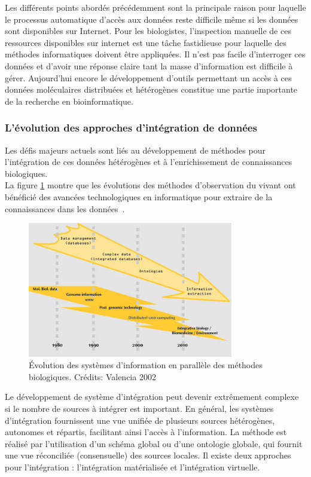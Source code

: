 Les différents points abordés précédemment sont la principale raison pour laquelle le processus automatique d’accès aux données reste difficile même si les données sont disponibles sur Internet. Pour les biologistes, l'inspection manuelle de ces ressources disponibles sur internet est une tâche fastidieuse pour laquelle des méthodes informatiques doivent être appliquées. Il n’est pas facile d’interroger ces données et d’avoir une réponse claire tant la masse d’information est difficile à gérer. Aujourd'hui encore le développement d'outils permettant un accès à ces données moléculaires distribuées et hétérogènes constitue une partie importante de la recherche en bioinformatique. 

\subsubsection{L'évolution des approches d'intégration de données}
Les défis majeurs actuels sont liés au développement de méthodes pour l’intégration de ces données hétérogènes et à l’enrichissement de connaissances biologiques.\\
La figure \ref{fig:databases} montre que les évolutions des méthodes d'observation du vivant ont bénéficié des avancées technologiques en informatique pour extraire de la connaissances dans les données~\cite{valencia2002}.

 \begin{figure}[!ht]
    \centering
    \includegraphics[width=0.8\textwidth]{hdr_manuscript/Figures/valencia2002.jpg}
    \caption{ Évolution des systèmes d'information en parallèle des méthodes biologiques. Crédits: Valencia 2002~\cite{valencia2002}}
    \label{fig:databases}
\end{figure}

Le développement de système d'intégration peut devenir extrêmement complexe si le nombre de sources à intégrer est important. En général, les systèmes d’intégration fournissent une vue unifiée de plusieurs sources hétérogènes, autonomes et répartis, facilitant ainsi l’accès à l’information. La méthode est réalisé par l’utilisation d’un schéma global ou d’une ontologie globale, qui fournit une vue réconciliée (consensuelle) des sources locales. Il existe deux   approches   pour   l’intégration :   l’intégration   matérialisée   et   l’intégration   virtuelle. \\

